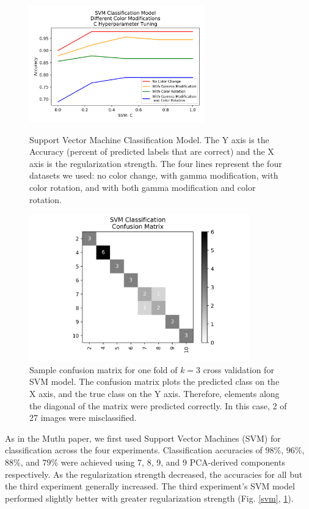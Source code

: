 \documentclass[journal]{IEEEtran}
\begin{document}
\begin{figure}
\centering
\includegraphics[height=2in]{SVM/svm_classification.png}
\caption{Support Vector Machine Classification Model. The Y axis is the Accuracy (percent of predicted labels that are correct) and the X axis is the regularization strength. The four lines represent the four datasets we used: no color change, with gamma modification, with color rotation, and with both gamma modification and color rotation.}
\label{svm}

\centering
\includegraphics[height=2.5in]{SVM/SVM_classification_cfm.png}
\caption{Sample confusion matrix for one fold of $k=3$ cross validation for SVM model. The confusion matrix plots the predicted class on the X axis, and the true class on the Y axis. Therefore, elements along the diagonal of the matrix were predicted correctly. In this case, 2 of 27 images were misclassified.}
\label{svm_confusion}
\end{figure}

As in the Mutlu paper, we first used Support Vector Machines (SVM) for classification across the four experiments. Classification accuracies of $98\%$, $96\%$, $88\%$, and $79\%$ were achieved using 7, 8, 9, and 9 PCA-derived components respectively. As the regularization strength decreased, the accuracies for all but the third experiment generally increased. The third experiment’s SVM model performed slightly better with greater regularization strength (Fig. \ref{svm}, \ref{svm_confusion}).
\end{document}
